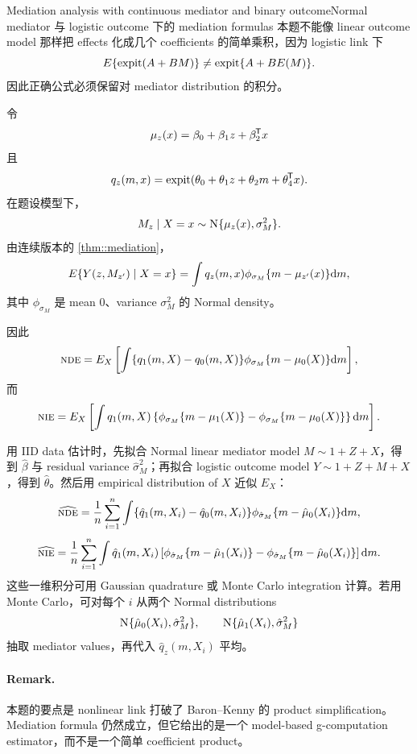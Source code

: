 \begin{exercisesolution}{Mediation analysis with continuous mediator and binary outcome}{Normal mediator 与 logistic outcome 下的 mediation formulas}
本题不能像 linear outcome model 那样把 effects 化成几个 coefficients 的简单乘积，因为 logistic link 下
\[
E\{\textup{expit}(A+B M)\}\neq \textup{expit}\{A+B E(M)\}.
\]
因此正确公式必须保留对 mediator distribution 的积分。

令
\[
\mu_z(x)=\beta_0+\beta_1z+\beta_2^{\mkern-1.5mu\mathsf{T}} x
\]
且
\[
q_z(m,x)=\textup{expit}(\theta_0+\theta_1z+\theta_2m+\theta_4^{\mkern-1.5mu\mathsf{T}} x).
\]
在题设模型下，
\[
M_z\mid X=x\sim \textsc{N}\{\mu_z(x),\sigma_M^2\}.
\]
由连续版本的 \cref{thm::mediation}，
\[
E\{Y(z,M_{z'})\mid X=x\}
=
\int q_z(m,x)\phi_{\sigma_M}\{m-\mu_{z'}(x)\}\textnormal{d} m,
\]
其中 $\phi_{\sigma_M}$ 是 mean $0$、variance $\sigma_M^2$ 的 Normal density。

因此
\[
\textsc{nde}
=
E_X\left[
\int \{q_1(m,X)-q_0(m,X)\}
\phi_{\sigma_M}\{m-\mu_0(X)\}\textnormal{d} m
\right],
\]
而
\[
\textsc{nie}
=
E_X\left[
\int q_1(m,X)
\left\{
\phi_{\sigma_M}\{m-\mu_1(X)\}
-
\phi_{\sigma_M}\{m-\mu_0(X)\}
\right\}\textnormal{d} m
\right].
\]

用 IID data 估计时，先拟合 Normal linear mediator model $M\sim 1+Z+X$，得到 $\hat\beta$ 与 residual variance $\hat\sigma_M^2$；再拟合 logistic outcome model $Y\sim 1+Z+M+X$，得到 $\hat\theta$。然后用 empirical distribution of $X$ 近似 $E_X$：
\[
\widehat{\textsc{nde}}
=
\frac{1}{n}\sum_{i=1}^n
\int \{\hat q_1(m,X_i)-\hat q_0(m,X_i)\}
\phi_{\hat\sigma_M}\{m-\hat\mu_0(X_i)\}\textnormal{d} m,
\]
\[
\widehat{\textsc{nie}}
=
\frac{1}{n}\sum_{i=1}^n
\int \hat q_1(m,X_i)
\left[
\phi_{\hat\sigma_M}\{m-\hat\mu_1(X_i)\}
-
\phi_{\hat\sigma_M}\{m-\hat\mu_0(X_i)\}
\right]\textnormal{d} m.
\]
这些一维积分可用 Gaussian quadrature 或 Monte Carlo integration 计算。若用 Monte Carlo，可对每个 $i$ 从两个 Normal distributions
\[
\textsc{N}\{\hat\mu_0(X_i),\hat\sigma_M^2\},
\qquad
\textsc{N}\{\hat\mu_1(X_i),\hat\sigma_M^2\}
\]
抽取 mediator values，再代入 $\hat q_z(m,X_i)$ 平均。

\paragraph{Remark.}
本题的要点是 nonlinear link 打破了 Baron--Kenny 的 product simplification。Mediation formula 仍然成立，但它给出的是一个 model-based g-computation estimator，而不是一个简单 coefficient product。
\end{exercisesolution}

